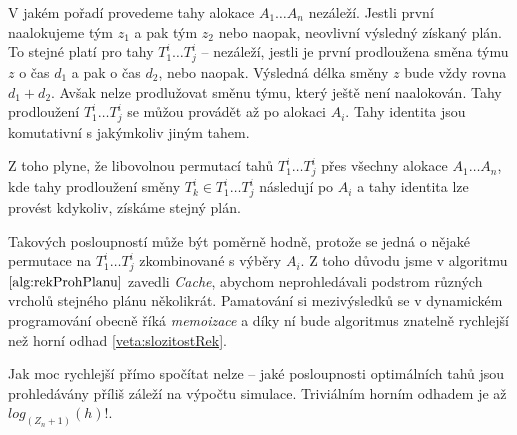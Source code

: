 V jakém pořadí provedeme tahy alokace $A_1 \dots A_n$ nezáleží. Jestli první naalokujeme tým $z_1$ a pak tým $z_2$ nebo naopak, neovlivní výsledný získaný plán.
To stejné platí pro tahy $T^i_1 \dots T^i_j$ -- nezáleží, jestli je první prodloužena směna týmu $z$ o čas $d_1$ a pak o čas $d_2$, nebo naopak. Výsledná délka směny $z$ bude vždy rovna $d_1 + d_2$.
Avšak nelze prodlužovat směnu týmu, který ještě není naalokován. Tahy prodloužení $T^i_1 \dots T^i_j$ se můžou provádět až po alokaci $A_i$.
Tahy identita jsou komutativní s jakýmkoliv jiným tahem.

Z toho plyne, že libovolnou permutací tahů $T^i_1 \dots T^i_j$ přes všechny alokace $A_1 \dots A_n$, kde tahy prodloužení směny $T^i_k \in T^i_1 \dots T^i_j$ následují po $A_i$
a tahy identita lze provést kdykoliv, získáme stejný plán.

Takových posloupností může být poměrně hodně, protože se jedná o nějaké permutace na $T^i_1 \dots T^i_j$ zkombinované s výběry $A_i$.
Z toho důvodu jsme v algoritmu $\ref{alg:rekProhPlanu}$ zavedli \textit{Cache}, abychom neprohledávali podstrom různých vrcholů stejného plánu několikrát.
Pamatování si mezivýsledků se v dynamickém programování obecně říká \textit{memoizace} a díky ní bude algoritmus znatelně rychlejší než horní odhad \ref{veta:slozitostRek}.

Jak moc rychlejší přímo spočítat nelze -- jaké posloupnosti optimálních tahů jsou prohledávány příliš záleží na výpočtu simulace. 
Triviálním horním odhadem je až $log_{(Z_n + 1)}(h)!$.

